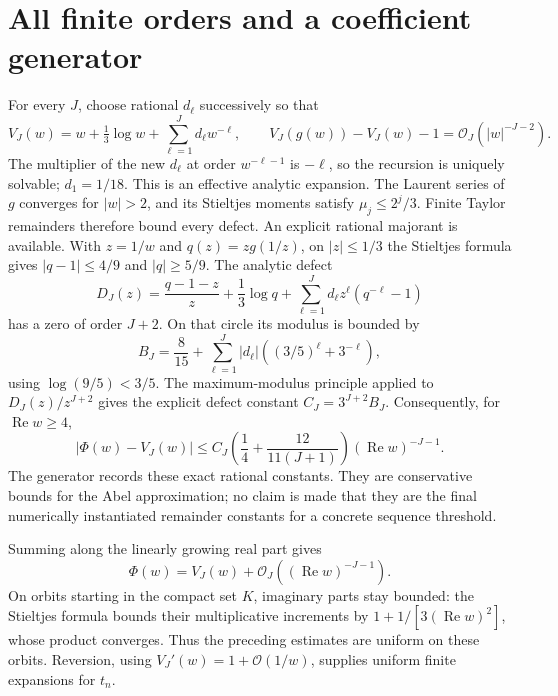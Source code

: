 \documentclass[11pt,letterpaper]{article}
\theoremstyle{remark}\newtheorem{remark}[theorem]{Remark}
\newcommand{\Oh}{\mathcal O}
\DeclareMathOperator{\Rea}{Re}
\begin{document}
\section{All finite orders and a coefficient generator}\label{ibd:sec:orders}
For every $J$, choose rational $d_\ell$ successively so that
\[
 V_J(w)=w+\tfrac13\log w+\sum_{\ell=1}^J d_\ell w^{-\ell},\qquad
 V_J(g(w))-V_J(w)-1=\Oh_J(|w|^{-J-2}).
\]
The multiplier of the new $d_\ell$ at order $w^{-\ell-1}$ is $-\ell$, so the recursion is uniquely solvable; $d_1=1/18$. This is an effective analytic expansion. The Laurent series of $g$ converges for $|w|>2$, and its Stieltjes moments satisfy $\mu_j\leq2^j/3$. Finite Taylor remainders therefore bound every defect. An explicit rational majorant is available. With $z=1/w$ and $q(z)=zg(1/z)$, on $|z|\leq1/3$ the Stieltjes formula gives $|q-1|\leq4/9$ and $|q|\geq5/9$. The analytic defect
\[
 D_J(z)=\frac{q-1-z}{z}+\frac13\log q+
       \sum_{\ell=1}^Jd_\ell z^\ell(q^{-\ell}-1)
\]
has a zero of order $J+2$. On that circle its modulus is bounded by
\[
 B_J=\frac8{15}+\sum_{\ell=1}^J|d_\ell|
                   \left((3/5)^\ell+3^{-\ell}\right),
\]
using $\log(9/5)<3/5$. The maximum-modulus principle applied to $D_J(z)/z^{J+2}$ gives the explicit defect constant $C_J=3^{J+2}B_J$. Consequently, for $\Rea w\geq4$,
\begin{equation}\label{ibd:eq:generalremainder}
 |\Phi(w)-V_J(w)|\leq
 C_J\left(\frac14+\frac{12}{11(J+1)}\right)(\Rea w)^{-J-1}.
\end{equation}
The generator records these exact rational constants. They are conservative bounds for the Abel approximation; no claim is made that they are the final numerically instantiated remainder constants for a concrete sequence threshold.

Summing along the linearly growing real part gives
\[
 \Phi(w)=V_J(w)+\Oh_J((\Rea w)^{-J-1}).
\]
On orbits starting in the compact set $K$, imaginary parts stay bounded: the Stieltjes formula bounds their multiplicative increments by
$1+1/[3(\Rea w)^2]$, whose product converges. Thus the preceding estimates are uniform on these orbits. Reversion, using $V_J'(w)=1+\Oh(1/w)$, supplies uniform finite expansions for $t_n$.
\end{document}
